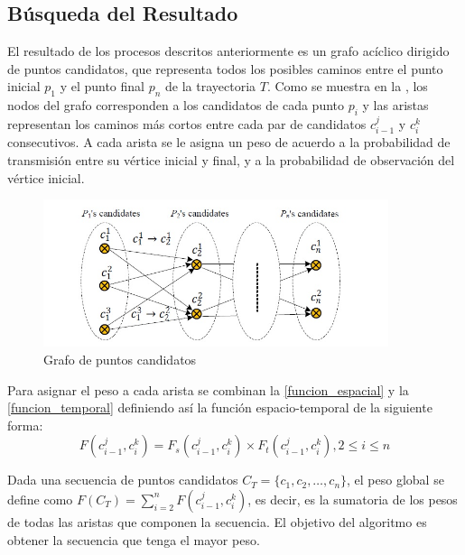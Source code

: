 \subsection{Búsqueda del Resultado}

\label{busqueda_de_resultado}
El resultado de los procesos descritos anteriormente es un grafo acíclico dirigido de puntos candidatos, que representa todos los posibles caminos entre el punto inicial $p_1$ y el punto final $p_n$ de la trayectoria $T$. Como se muestra en la , los nodos del grafo corresponden a los candidatos de cada punto $p_i$ y las aristas representan los caminos más cortos entre cada par de candidatos $c_{i-1}^j$ y $c_i^k$ consecutivos. A cada arista se le asigna un peso de acuerdo a la probabilidad de transmisión entre su vértice inicial y final, y a la probabilidad de observación del vértice inicial.

\begin{figure}[h*]
	\centering
	\includegraphics[width=0.9\textwidth]{capitulos/6/figuras/figura9.jpg}
	\caption{\label{fig:grafo_de_candidatos} Grafo de puntos candidatos}	
\end{figure}

Para asignar el peso a cada arista se combinan la \cref{funcion_espacial} y la \cref{funcion_temporal} definiendo así la función espacio-temporal de la siguiente forma:
\begin{equation} \label{funcion_espacio_temporal}
F(c_{i-1}^{j},c_{i}^{k}) = F_s(c_{i-1}^{j},c_{i}^{k}) \times F_{ t }(c_{ i-1 }^{ j },c_{ i }^{ k }), 2 \leq i \leq n
\end{equation}

Dada una secuencia de puntos candidatos $C_T = \{c_1, c_2, \dots, c_n\}$, el peso global se define como $F(C_T) = \sum _{ i=2 }^{ n }{F(c_{i-1}^{j},c_{i}^{k})}$, es decir, es la sumatoria de los pesos de todas las aristas que componen la secuencia. El objetivo del algoritmo es obtener la secuencia que tenga el mayor peso.

